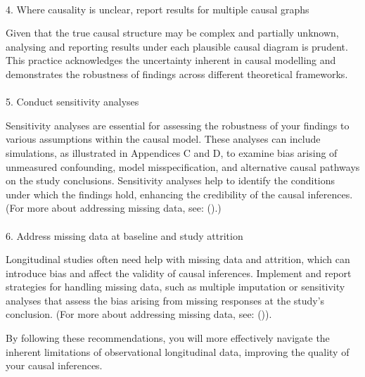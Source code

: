 \documentclass[
  single column]{article}
\makeatletter
\let\oldparagraph\paragraph
\renewcommand{\paragraph}{
    \@ifstar
      \xxxParagraphStar
      \xxxParagraphNoStar
  }
\newcommand{\xxxParagraphStar}[1]{\oldparagraph*{#1}\mbox{}}
\newcommand{\xxxParagraphNoStar}[1]{\oldparagraph{#1}\mbox{}}
\makeatother
\begin{document}
\paragraph{4. Where causality is unclear, report results for multiple
causal
graphs}\label{where-causality-is-unclear-report-results-for-multiple-causal-graphs}

Given that the true causal structure may be complex and partially
unknown, analysing and reporting results under each plausible causal
diagram is prudent. This practice acknowledges the uncertainty inherent
in causal modelling and demonstrates the robustness of findings across
different theoretical frameworks.

\paragraph{5. Conduct sensitivity
analyses}\label{conduct-sensitivity-analyses}

Sensitivity analyses are essential for assessing the robustness of your
findings to various assumptions within the causal model. These analyses
can include simulations, as illustrated in Appendices C and D, to
examine bias arising of unmeasured confounding, model misspecification,
and alternative causal pathways on the study conclusions. Sensitivity
analyses help to identify the conditions under which the findings hold,
enhancing the credibility of the causal inferences. (For more about
addressing missing data, see:
().)

\paragraph{6. Address missing data at baseline and study
attrition}\label{address-missing-data-at-baseline-and-study-attrition}

Longitudinal studies often need help with missing data and attrition,
which can introduce bias and affect the validity of causal inferences.
Implement and report strategies for handling missing data, such as
multiple imputation or sensitivity analyses that assess the bias arising
from missing responses at the study's conclusion. (For more about
addressing missing data, see:
()).

By following these recommendations, you will more effectively navigate
the inherent limitations of observational longitudinal data, improving
the quality of your causal inferences.
\end{document}
